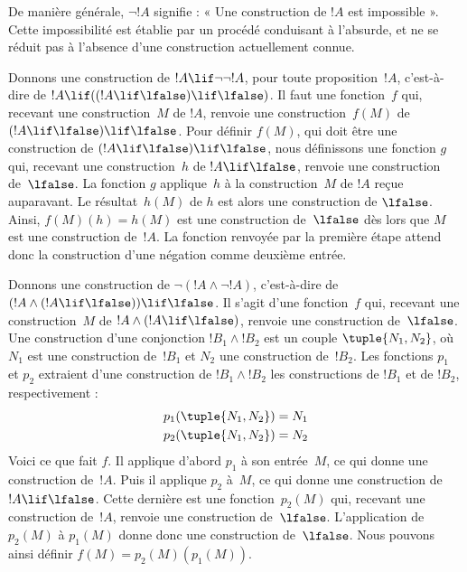 \documentclass[../../../include/open-logic-section]{subfiles}
\begin{document}
De manière générale, $\lnot !A$ signifie : « Une construction
de $!A$ est impossible ». Cette impossibilité est établie par un
procédé conduisant à l'absurde, et ne se réduit pas à l'absence
d'une construction actuellement connue.

\begin{ex}
Donnons une construction de $!A \lif \lnot \lnot !A$, pour toute
proposition~$!A$, c'est-à-dire de
$!A \lif ((!A \lif \lfalse) \lif \lfalse)$.
Il faut une fonction~$f$ qui, recevant une construction~$M$
de $!A$, renvoie une construction~$f(M)$ de
$(!A \lif \lfalse) \lif \lfalse$.
Pour définir $f(M)$, qui doit être une construction de
$(!A \lif \lfalse) \lif \lfalse$, nous définissons
une fonction $g$ qui, recevant une construction~$h$
de $!A \lif \lfalse$, renvoie une construction de~$\lfalse$.
La fonction $g$ applique~$h$ à la construction~$M$ de $!A$
reçue auparavant. Le résultat~$h(M)$ de $h$ est alors une
construction de $\lfalse$. Ainsi, $f(M)(h) = h(M)$ est une
construction de~$\lfalse$ dès lors que $M$ est une construction
de~$!A$. La fonction renvoyée par la première étape attend donc
la construction d'une négation comme deuxième entrée.
\end{ex}

\begin{ex}
Donnons une construction de $\lnot(!A \land \lnot !A)$,
c'est-à-dire de $(!A \land (!A \lif \lfalse)) \lif \lfalse$.
Il s'agit d'une fonction~$f$ qui, recevant une construction~$M$
de $!A \land (!A \lif \lfalse)$, renvoie une construction
de~$\lfalse$. Une construction d'une conjonction
$!B_1 \land !B_2$ est un couple $\tuple{N_1, N_2}$, où
$N_1$ est une construction de~$!B_1$ et $N_2$ une construction
de~$!B_2$. Les fonctions $p_1$ et $p_2$ extraient d'une
construction de $!B_1 \land !B_2$ les constructions de
$!B_1$ et de $!B_2$, respectivement :
\begin{align*}
  p_1(\tuple{N_1, N_2}) &= N_1\\
  p_2(\tuple{N_1, N_2}) &= N_2
\end{align*}
Voici ce que fait $f$. Il applique d'abord $p_1$ à son entrée~$M$,
ce qui donne une construction de~$!A$. Puis il applique $p_2$
à~$M$, ce qui donne une construction de~$!A \lif \lfalse$.
Cette dernière est une fonction~$p_2(M)$ qui, recevant une
construction de~$!A$, renvoie une construction de~$\lfalse$.
L'application de $p_2(M)$ à $p_1(M)$ donne donc une construction
de~$\lfalse$. Nous pouvons ainsi définir
$f(M) = p_2(M)(p_1(M))$.
\end{ex}
\end{document}
